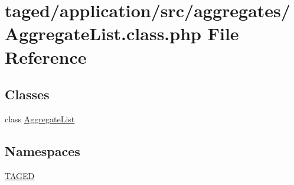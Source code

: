 \hypertarget{_aggregate_list_8class_8php}{}\section{taged/application/src/aggregates/\+Aggregate\+List.class.\+php File Reference}
\label{_aggregate_list_8class_8php}
\subsection*{Classes}
\begin{DoxyCompactItemize}
\item 
class \hyperlink{class_aggregate_list}{Aggregate\+List}
\end{DoxyCompactItemize}
\subsection*{Namespaces}
\begin{DoxyCompactItemize}
\item 
 \hyperlink{namespace_t_a_g_e_d}{T\+A\+G\+ED}
\end{DoxyCompactItemize}
